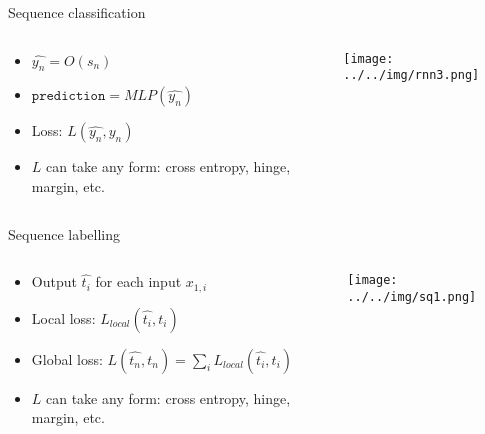 \documentclass[usenames,dvipsnames,handout,aspectratio=169]{beamer}
\begin{document}
\begin{frame}{Sequence classification}	

\begin{columns}
\begin{column}{0.5\textwidth}


\begin{itemize}
\item $\hat{y_n} = O(s_n)$
\item $\texttt{prediction} = MLP(\hat{y_n})$
\item Loss: $L(\hat{y_n}, y_n)$
\item $L$ can take any  form: cross entropy, hinge, margin, etc.
\end{itemize}


\end{column}

\begin{column}{0.5\textwidth}

\texttt{[image: ../../img/rnn3.png]}
	
\end{column}
\end{columns}
\end{frame}


\begin{frame}{Sequence labelling}	


\begin{columns}
\begin{column}{0.5\textwidth}


\begin{itemize}
	\item Output $\hat{t_i}$ for each input $x_{1,i}$
	\item Local loss: $L_{local}( \hat{t_i}, t_i)$
	\item Global loss: $L(\hat{t_n}, t_n ) = \sum_i L_{local}(\hat{t_i}, t_i)$
	\item $L$ can take any  form: cross entropy, hinge, margin, etc.
\end{itemize}

\end{column}
\begin{column}{0.5\textwidth}


\texttt{[image: ../../img/sq1.png]}
\end{column}
\end{columns}
\end{frame}
\end{document}
